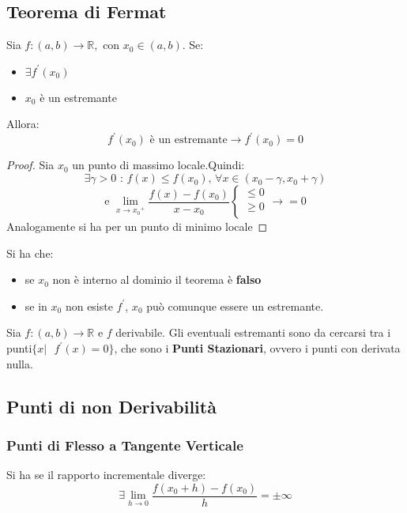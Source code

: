 \documentclass[a4paper,12pt, oneside]{book}
\begin{document}
\subsection{Teorema di Fermat}
\begin{teorema}[di Fermat]
Sia $f:(a,b)\rightarrow \mathbb{R}, \mbox{ con } x_0\in (a,b)$. Se:
\begin{itemize}
\item $\exists f^{'}(x_0)$
\item $x_0$ è un estremante
\end{itemize}
Allora: $$f^{'}(x_0) \mbox{ è un estremante}\rightarrow f^{'}(x_0)=0$$
\end{teorema}
\begin{proof}
Sia $x_0$ un punto di massimo locale.Quindi: $$\exists\gamma>0 \mbox{ : } f(x)\leq f(x_0) \mbox{, } \forall x\in (x_0-\gamma, x_0+\gamma)$$
$$\mbox{e }\lim_{x\rightarrow {x_0}^{+}}\frac{f(x)-f(x_0)}{x-x_0}\left\{
        \begin{array}{ll} 
        \leq0\\
        \geq0\\
        \end{array}
\right.\longrightarrow =0$$
Analogamente si ha per un punto di minimo locale
\end{proof}
\begin{shaded}
\begin{osservazione}
Si ha che:
\begin{itemize}
\item se $x_0$ non è interno al dominio il teorema è \textbf{falso}
\item se in $x_0$ non esiste $f^{'}$, $x_0$ può comunque essere un estremante.
\end{itemize}
\end{osservazione}
\begin{osservazione}
Sia $f:(a,b)\rightarrow\mathbb{R} \mbox{ e } f$ derivabile. Gli eventuali estremanti sono da cercarsi tra i punti$\{x|\mbox{ }f^{'}(x)=0\}$, che sono i \textbf{Punti Stazionari}, ovvero i punti con derivata nulla.
\end{osservazione}
\end{shaded}
\subsection{Punti di non Derivabilità}
\subsubsection{Punti di Flesso a Tangente Verticale}
Si ha se il rapporto incrementale diverge:
$$\exists\lim_{h\rightarrow 0} \frac{f(x_0+h)-f(x_0)}{h}=\pm\infty$$
\end{document}
